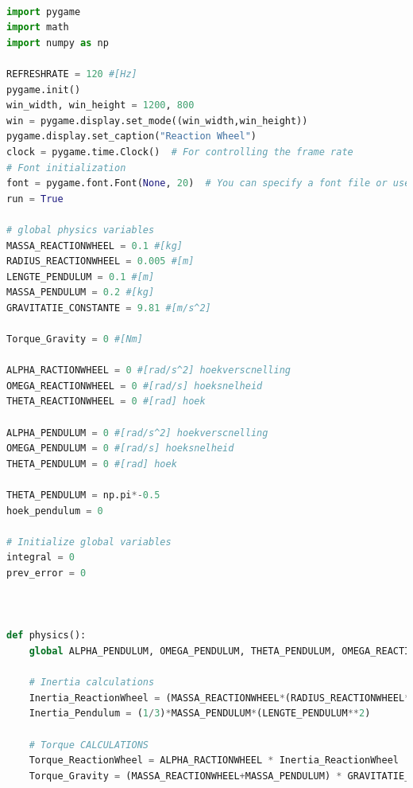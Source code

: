 \documentclass{article}
\begin{document}
\lstset{style=mystyle}
\begin{lstlisting}[language=Python, caption=Python simulation]

import pygame
import math
import numpy as np

REFRESHRATE = 120 #[Hz]
pygame.init()
win_width, win_height = 1200, 800
win = pygame.display.set_mode((win_width,win_height))
pygame.display.set_caption("Reaction Wheel")
clock = pygame.time.Clock()  # For controlling the frame rate
# Font initialization
font = pygame.font.Font(None, 20)  # You can specify a font file or use None for default font and size
run = True

# global physics variables
MASSA_REACTIONWHEEL = 0.1 #[kg]
RADIUS_REACTIONWHEEL = 0.005 #[m]
LENGTE_PENDULUM = 0.1 #[m]
MASSA_PENDULUM = 0.2 #[kg]
GRAVITATIE_CONSTANTE = 9.81 #[m/s^2]

Torque_Gravity = 0 #[Nm]

ALPHA_RACTIONWHEEL = 0 #[rad/s^2] hoekverscnelling
OMEGA_REACTIONWHEEL = 0 #[rad/s] hoeksnelheid
THETA_REACTIONWHEEL = 0 #[rad] hoek

ALPHA_PENDULUM = 0 #[rad/s^2] hoekverscnelling
OMEGA_PENDULUM = 0 #[rad/s] hoeksnelheid
THETA_PENDULUM = 0 #[rad] hoek

THETA_PENDULUM = np.pi*-0.5
hoek_pendulum = 0

# Initialize global variables
integral = 0
prev_error = 0



def physics():
    global ALPHA_PENDULUM, OMEGA_PENDULUM, THETA_PENDULUM, OMEGA_REACTIONWHEEL, THETA_REACTIONWHEEL, Torque_Gravity, hoek_pendulum
    
    # Inertia calculations
    Inertia_ReactionWheel = (MASSA_REACTIONWHEEL*(RADIUS_REACTIONWHEEL**2))/2
    Inertia_Pendulum = (1/3)*MASSA_PENDULUM*(LENGTE_PENDULUM**2)

    # Torque CALCULATIONS
    Torque_ReactionWheel = ALPHA_RACTIONWHEEL * Inertia_ReactionWheel
    Torque_Gravity = (MASSA_REACTIONWHEEL+MASSA_PENDULUM) * GRAVITATIE_CONSTANTE * np.cos(THETA_PENDULUM)


\end{lstlisting}
\end{document}
